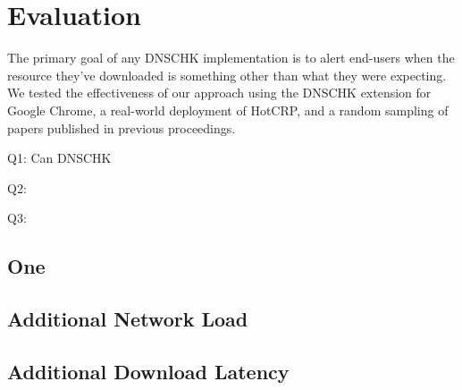 \section{Evaluation} \label{sec:evaluation}

The primary goal of any DNSCHK implementation is to alert end-users when the
resource they've downloaded is something other than what they were expecting. We
tested the effectiveness of our approach using the DNSCHK extension for Google
Chrome, a real-world deployment of HotCRP, and a random sampling of papers
published in previous \CONFERENCE{} proceedings.

Q1: Can DNSCHK 

Q2:

Q3:

\subsection{One}

\subsection{Additional Network Load}

\subsection{Additional Download Latency}
